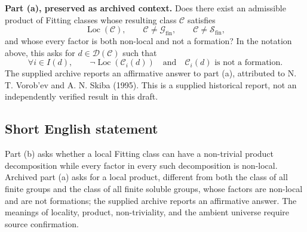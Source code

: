 \documentclass[11pt]{article}
\begin{document}
\textbf{Part (a), preserved as archived context.} Does there exist an admissible product of Fitting classes whose resulting class \(\mathcal C\) satisfies
\[
\operatorname{Loc}(\mathcal C),\qquad
\mathcal C\ne\mathcal G_{\mathrm{fin}},\qquad
\mathcal C\ne\mathcal S_{\mathrm{fin}},
\]
and whose every factor is both non-local and not a formation? In the notation above, this asks for \(d\in\mathscr D(\mathcal C)\) such that
\[
\forall i\in I(d),\qquad
\neg\operatorname{Loc}(\mathcal C_i(d))
\quad\text{and}\quad
\mathcal C_i(d)\text{ is not a formation}.
\]
The supplied archive reports an affirmative answer to part (a), attributed to N. T. Vorob'ev and A. N. Skiba (1995). This is a supplied historical report, not an independently verified result in this draft.
\subsection{Short English statement}
Part (b) asks whether a local Fitting class can have a non-trivial product decomposition while every factor in every such decomposition is non-local. Archived part (a) asks for a local product, different from both the class of all finite groups and the class of all finite soluble groups, whose factors are non-local and are not formations; the supplied archive reports an affirmative answer. The meanings of locality, product, non-triviality, and the ambient universe require source confirmation.
\end{document}
